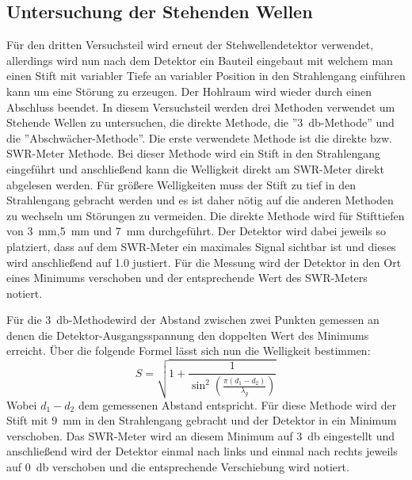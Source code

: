     \subsection{Untersuchung der Stehenden Wellen}
        Für den dritten Versuchsteil wird erneut der Stehwellendetektor verwendet, allerdings wird nun nach dem Detektor ein Bauteil eingebaut mit welchem man einen Stift mit variabler Tiefe an variabler Position in den Strahlengang einführen kann um eine Störung zu erzeugen.
        Der Hohlraum wird wieder durch einen Abschluss beendet.
        In diesem Versuchsteil werden drei Methoden verwendet um Stehende Wellen zu untersuchen, die direkte Methode, die ”\SI{3}{\decibel}-Methode” und die ”Abschwächer-Methode”.
        Die erste verwendete Methode ist die direkte bzw. SWR-Meter Methode.
        Bei dieser Methode wird ein Stift in den Strahlengang eingeführt und anschließend kann die Welligkeit direkt am SWR-Meter direkt abgelesen werden. Für größere Welligkeiten muss der Stift zu tief in den Strahlengang gebracht werden und es ist daher nötig auf die anderen Methoden zu wechseln um Störungen zu vermeiden.
        Die direkte Methode wird für Stifttiefen von \SI{3}{\milli\metre},\SI{5}{\milli\metre} und \SI{7}{\milli\metre} durchgeführt. Der Detektor wird dabei jeweils so platziert, dass auf dem SWR-Meter ein maximales Signal sichtbar ist und dieses wird anschließend auf \num{1.0} justiert. Für die Messung wird der Detektor in den Ort eines Minimums verschoben und der entsprechende Wert des SWR-Meters notiert.

        Für die \glqq \SI{3}{\decibel}-Methode\glqq  wird der Abstand zwischen zwei Punkten gemessen an denen die Detektor-Ausgangsspannung den doppelten Wert des Minimums erreicht. Über die folgende Formel lässt sich nun die Welligkeit bestimmen:
        \begin{equation}
            \label{eqn:SWR}
            S = \sqrt{1+\frac{1}{\sin^2\left(\frac{\pi \left(d_1 - d_2\right)}{\lambda_g}\right)}}
        \end{equation}
        Wobei $d_1 - d_2$ dem gemessenen Abstand entspricht.
        Für diese Methode wird der Stift mit \SI{9}{\milli\metre} in den Strahlengang gebracht und der Detektor in ein Minimum verschoben.
        Das SWR-Meter wird an diesem Minimum auf \SI{3}{\decibel} eingestellt und anschließend wird der Detektor einmal nach links und einmal nach rechts jeweils auf \SI{0}{\decibel} verschoben und die entsprechende Verschiebung wird notiert.

